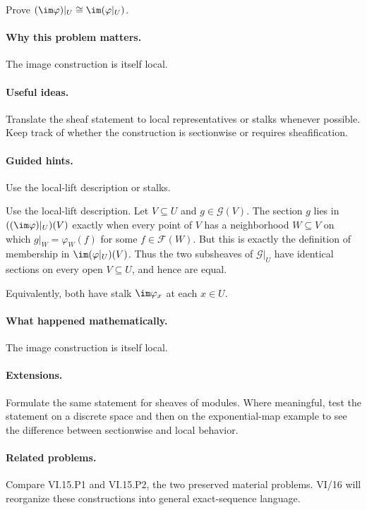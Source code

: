 \begin{problem}\label{prob:vi15-p13}
Prove $(\im\varphi)|_U\cong\im(\varphi|_U)$.
\end{problem}

\ifdefined\FullProblemDossiers
\paragraph{Why this problem matters.}
The image construction is itself local.

\paragraph{Useful ideas.}
Translate the sheaf statement to local representatives or stalks whenever possible.  Keep track of whether the construction is sectionwise or requires sheafification.

\paragraph{Guided hints.}
Use the local-lift description or stalks.

\begin{solution}
Use the local-lift description. Let $V\subseteq U$ and $g\in\mathcal G(V)$. The section $g$ lies in $((\im\varphi)|_U)(V)$ exactly when every point of $V$ has a neighborhood $W\subseteq V$ on which $g|_W=\varphi_W(f)$ for some $f\in\mathcal F(W)$. But this is exactly the definition of membership in $\im(\varphi|_U)(V)$. Thus the two subsheaves of $\mathcal G|_U$ have identical sections on every open $V\subseteq U$, and hence are equal.

Equivalently, both have stalk $\im\varphi_x$ at each $x\in U$.
\end{solution}

\paragraph{What happened mathematically.}
The image construction is itself local.

\paragraph{Extensions.}
Formulate the same statement for sheaves of modules.  Where meaningful, test the statement on a discrete space and then on the exponential-map example to see the difference between sectionwise and local behavior.

\paragraph{Related problems.}
Compare VI.15.P1 and VI.15.P2, the two preserved material problems.  VI/16 will reorganize these constructions into general exact-sequence language.
\fi
